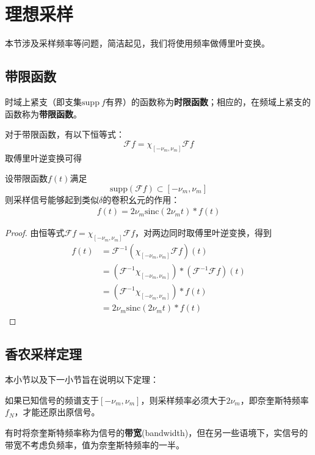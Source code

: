 \section{理想采样}\label{sec:Ideal_Sample}

本节涉及采样频率等问题，简洁起见，我们将使用频率做傅里叶变换。

\subsection{带限函数}\label{sub:band_limit}

\begin{definition}[时限函数与带限函数]
    时域上紧支（即支集$\mathrm{supp}\ f$有界）的函数称为\textbf{时限函数}；相应的，在频域上紧支的函数称为\textbf{带限函数}。
\end{definition}

对于带限函数，有以下恒等式：
\[\mathcal{F} f=\chi_{[-\nu_m,\nu_m]}\mathcal{F} f\]
取傅里叶逆变换可得
\begin{theorem}
    设带限函数$f(t)$满足$$\mathrm{supp}(\mathcal{F} f)\subset [-\nu_m,\nu_m]$$
    则采样信号能够起到类似$\delta$的卷积幺元的作用：\begin{align*}
        f(t)=2\nu_m\mathrm{sinc}(2\nu_m t)*f(t)
    \end{align*}
\end{theorem}
\begin{proof}
    由恒等式$\mathcal{F} f=\chi_{[-\nu_m,\nu_m]}\mathcal{F} f$，对两边同时取傅里叶逆变换，得到
    \begin{align*}
        f(t)&=\mathcal{F} ^{-1}(\chi_{[-\nu_m,\nu_m]}\mathcal{F} f)(t)\\
               &=\left(\mathcal{F} ^{-1}\chi_{[-\nu_m,\nu_m]}\right)*\left(\mathcal{F} ^{-1}\mathcal{F} f\right)(t)\\
               &=\left(\mathcal{F} ^{-1}\chi_{[-\nu_m,\nu_m]}\right)*f(t)\\
               &=2\nu_m\mathrm{sinc}(2\nu_m t)*f(t)
    \end{align*}
\end{proof}

\subsection{香农采样定理}\label{sub:shannon}
本小节以及下一小节旨在说明以下定理：
\begin{theorem}[香农采样定理]
    如果已知信号的频谱支于$[-\nu_m,\nu_m]$，则采样频率必须大于$2\nu_m$，即奈奎斯特频率$f_N$，才能还原出原信号\cite{brad_osgood_ee261}。
\end{theorem}
有时将奈奎斯特频率称为信号的\textbf{带宽}(bandwidth)，但在另一些语境下，实信号的带宽不考虑负频率，值为奈奎斯特频率的一半。

